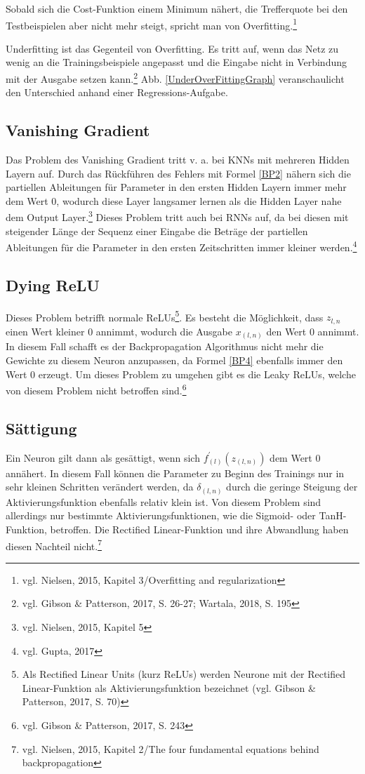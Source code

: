 \documentclass[
	a4paper,
	12pt,
	ngerman,
	oneside
]{scrreprt}											%
\newcommand{\practitioner}[1]{vgl. Gibson \& Patterson, 2017, S. {#1}}
\begin{document}
				Sobald sich die Cost-Funktion einem Minimum nähert, die Trefferquote bei den Testbeispielen aber nicht mehr steigt, spricht man von Overfitting.\footnote{vgl. Nielsen, 2015, Kapitel 3/Overfitting and regularization}
	
				Underfitting ist das Gegenteil von Overfitting. Es tritt auf, wenn das Netz zu wenig an die Trainingsbeispiele angepasst und die Eingabe nicht in Verbindung mit der Ausgabe setzen kann.\footnote{\practitioner{26-27; Wartala, 2018, S. 195}} Abb. \ref{UnderOverFittingGraph} veranschaulicht den Unterschied anhand einer Regressions-Aufgabe. 
				
	
			\subsection{Vanishing Gradient}\label{VanishingGradient}
				Das Problem des Vanishing Gradient tritt v. a. bei KNNs mit mehreren Hidden Layern auf. Durch das Rückführen des Fehlers mit Formel \ref{BP2} nähern sich die partiellen Ableitungen für Parameter in den ersten Hidden Layern immer mehr dem Wert 0, wodurch diese Layer langsamer lernen als die Hidden Layer nahe dem Output Layer.\footnote{vgl. Nielsen, 2015, Kapitel 5} Dieses Problem tritt auch bei RNNs auf, da bei diesen mit steigender Länge der Sequenz einer Eingabe die Beträge der partiellen Ableitungen für die Parameter in den ersten Zeitschritten immer kleiner werden.\footnote{vgl. Gupta, 2017}
	
			\subsection{Dying ReLU}\label{DyingReLU}
				Dieses Problem betrifft normale ReLUs\footnote{Als Rectified Linear Units (kurz ReLUs) werden Neurone mit der Rectified Linear-Funktion als Aktivierungsfunktion bezeichnet (\practitioner{70})}. Es besteht die Möglichkeit, dass $z_{l,n}$ einen Wert kleiner 0 annimmt, wodurch die Ausgabe $x_{(l,n)}$ den Wert 0 annimmt. In diesem Fall schafft es der Backpropagation Algorithmus nicht mehr die Gewichte zu diesem Neuron anzupassen, da Formel \ref{BP4} ebenfalls immer den Wert 0 erzeugt. Um dieses Problem zu umgehen gibt es die Leaky ReLUs, welche von diesem Problem nicht betroffen sind.\footnote{\practitioner{243}}
	
			\subsection{Sättigung}\label{Sättigung}
				Ein Neuron gilt dann als gesättigt, wenn sich $f_{(l)}^{\prime}(z_{(l,n)})$ dem Wert 0 annähert. In diesem Fall können die Parameter zu Beginn des Trainings nur in sehr kleinen Schritten verändert werden, da $\delta_{(l,n)}$ durch die geringe Steigung der Aktivierungsfunktion ebenfalls relativ klein ist. Von diesem Problem sind allerdings nur bestimmte Aktivierungsfunktionen, wie die Sigmoid- oder TanH-Funktion, betroffen. Die Rectified Linear-Funktion und ihre Abwandlung haben diesen Nachteil nicht.\footnote{vgl. Nielsen, 2015, Kapitel 2/The four fundamental equations behind backpropagation}
				
\end{document}
